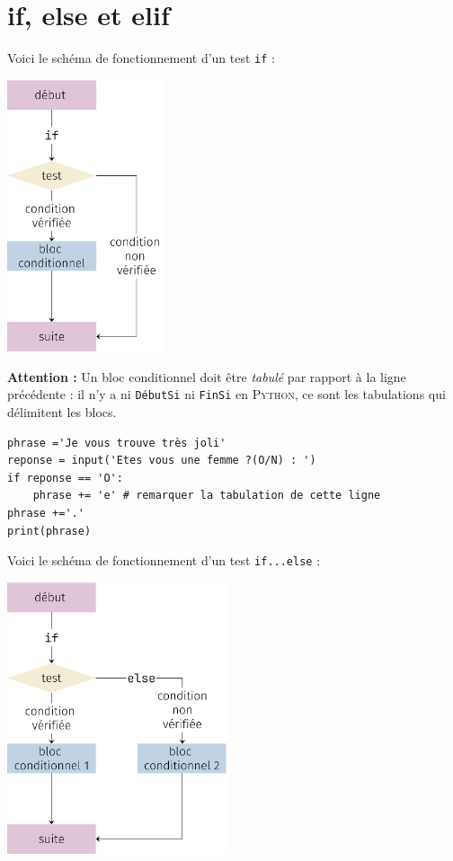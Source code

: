 \section{if, else et elif}
Voici le schéma de fonctionnement d'un test \texttt{if} :
\begin{center}
	\includegraphics[height=8cm]{ch-conditions/img/if}
\end{center}

\textbf{Attention :} Un bloc conditionnel doit être \textit{tabulé} par rapport à la ligne précédente : il n'y a ni \texttt{DébutSi}  ni \texttt{FinSi}
en \textsc{Python}, ce sont les tabulations qui délimitent les blocs.

\begin{pyc}
	\begin{verbatim}
phrase ='Je vous trouve très joli'
reponse = input('Etes vous une femme ?(O/N) : ')
if reponse == 'O': 
    phrase += 'e' # remarquer la tabulation de cette ligne
phrase +='.'
print(phrase)
\end{verbatim}
\end{pyc}

Voici le schéma de fonctionnement d'un test \texttt{if...else} :
\begin{center}
	\includegraphics[height=8cm]{ch-conditions/img/ifelse}
\end{center}

